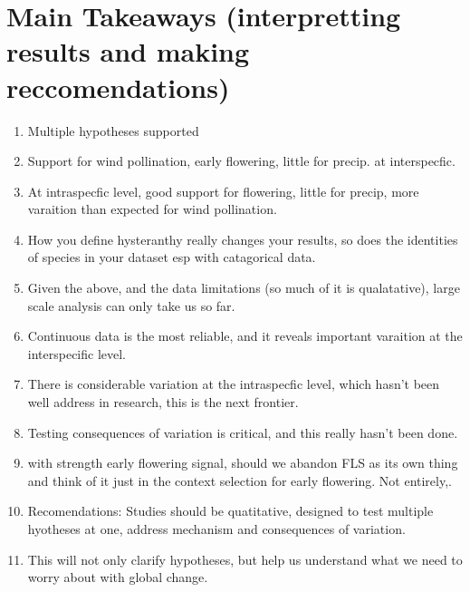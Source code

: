 \documentclass{article}\usepackage[]{graphicx}\usepackage[]{color}
\begin{document}
\section*{Main Takeaways (interpretting results and making reccomendations)}
\begin{enumerate}
\item Multiple hypotheses supported
\item Support for wind pollination, early flowering, little for precip. at interspecfic.
\item At intraspecfic level, good support for flowering, little for precip, more varaition than expected for wind pollination.
\item How you define hysteranthy really changes your results, so does the identities of species in your dataset esp with catagorical data.
\item Given the above, and the data limitations (so much of it is qualatative), large scale analysis can only take us so far.
\item Continuous data is the most reliable, and it reveals important varaition at the interspecific level.
\item There is considerable variation at the intraspecfic level, which hasn't been well address in research, this is the next frontier.
\item Testing consequences of variation is critical, and this really hasn't been done.
\item with strength early flowering signal, should we abandon FLS as its own thing and think of it just in the context selection for early flowering. Not entirely,.
\item Recomendations: Studies should be quatitative, designed to test multiple hyotheses at one, address mechanism and consequences of variation.
\item This will not only clarify hypotheses, but help us understand what we need to worry about with global change.
\end{enumerate}
\end{document}
